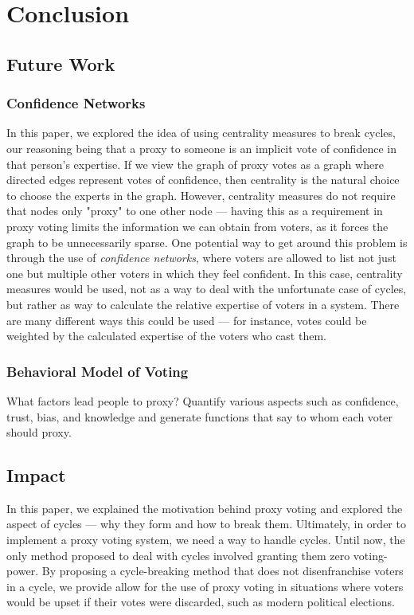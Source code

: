 \documentclass[10pt]{article}
\theoremstyle{definition}
\begin{document}
\section{Conclusion}

\subsection{Future Work}
\subsubsection{Confidence Networks}

In this paper, we explored the idea of using centrality measures to break cycles, our reasoning being that a proxy to someone is an implicit vote of confidence in that person's expertise. If we view the graph of proxy votes as a graph where directed edges represent votes of confidence, then centrality is the natural choice to choose the experts in the graph. However, centrality measures do not require that nodes only "proxy" to one other node --- having this as a requirement in proxy voting limits the information we can obtain from voters, as it forces the graph to be unnecessarily sparse. One potential way to get around this problem is through the use of \textit{confidence networks}, where voters are allowed to list not just one but multiple other voters in which they feel confident. In this case, centrality measures would be used, not as a way to deal with the unfortunate case of cycles, but rather as way to calculate the relative expertise of voters in a system. There are many different ways this could be used --- for instance, votes could be weighted by the calculated expertise of the voters who cast them.

\subsubsection{Behavioral Model of Voting}

What factors lead people to proxy? Quantify various aspects such as confidence, trust, bias, and knowledge and generate functions that say to whom each voter should proxy.

\subsection{Impact}
In this paper, we explained the motivation behind proxy voting and explored the aspect of cycles --- why they form and how to break them. Ultimately, in order to implement a proxy voting system, we need a way to handle cycles. Until now, the only method proposed to deal with cycles involved granting them zero voting-power. By proposing a cycle-breaking method that does not disenfranchise voters in a cycle, we provide allow for the use of proxy voting in situations where voters would be upset if their votes were discarded, such as modern political elections.
\end{document}
